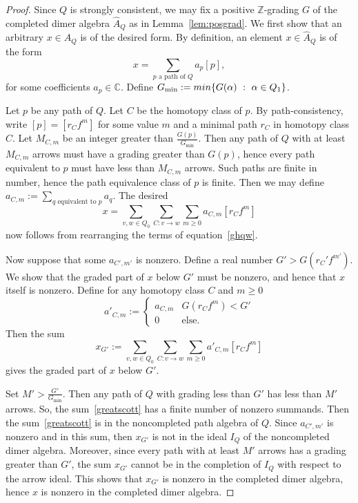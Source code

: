 \documentclass{article}
\theoremstyle{definition}
\begin{document}
\begin{proof}
Since $Q$ is strongly consistent, we may fix a positive $\mathbb Z$-grading $G$ of the completed dimer algebra $\widehat A_Q$ as in Lemma~\ref{lem:posgrad}.
	We first show that an arbitrary $x\in\widehat A_Q$ is of the desired form.
	By definition, an element $x\in\widehat A_Q$ is of the form 
	\begin{equation}\label{ghqw}x=\sum_{p\text{ a path of }Q}a_p[p],\end{equation}
	for some coefficients $a_p\in\mathbb C$.
	Define $G_{\min}:=\textup{min}\{G(\alpha)\ :\ \alpha\in Q_1\}$.

	Let $p$ be any path of $Q$.
Let $C$ be the homotopy class of $p$. By path-consistency, write $[p]=[r_Cf^{m}]$ for some value $m$ and a minimal path $r_C$ in homotopy class $C$.
	Let $M_{C,m}$ be an integer greater than $\frac{G(p)}{G_{\min}}$. Then any path of $Q$ with at least $M_{C,m}$ arrows must have a grading greater than $G(p)$, hence every path equivalent to $p$ must have less than $M_{C,m}$ arrows. Such paths are finite in number, hence the path equivalence class of $p$ is finite.
	Then we may define $a_{C,m}:=\sum_{q\text{ equivalent to }p}a_q$. The desired
\[x=\sum_{v,w\in Q_0}\sum_{C:v\to w}\sum_{m\geq0}a_{C,m}[r_Cf^m]\]
	now follows from rearranging the terms of equation~\eqref{ghqw}.

	Now suppose that some $a_{C',m'}$ is nonzero. Define a real number $G'>G(r_C'f^{m'})$. We show that the graded part of $x$ below $G'$ must be nonzero, and hence that $x$ itself is nonzero. Define for any homotopy class $C$ and $m\geq0$
	\[a'_{C,m}:=\begin{cases}
		a_{C,m}&G(r_Cf^m)<G' \\
		0&\text{else.}
	\end{cases}\]
	Then the sum
	\begin{equation}\label{greatscott}x_{G'}:=\sum_{v,w\in Q_0}\sum_{C:v\to w}\sum_{m\geq0}a'_{C,m}[r_Cf^m]\end{equation}
	gives the graded part of $x$ below $G'$.

	Set $M'>\frac{G'}{G_{\min}}$. Then any path of $Q$ with grading less than $G'$ has less than $M'$ arrows. So, the sum~\eqref{greatscott} has a finite number of nonzero summands. Then the sum~\eqref{greatscott} is in the noncompleted path algebra of $Q$. Since $a_{C',m'}$ is nonzero and in this sum, then $x_{G'}$ is not in the ideal $I_Q$ of the noncompleted dimer algebra.
	Moreover, since every path with at least $M'$ arrows has a grading greater than $G'$, the sum $x_{G'}$ cannot be in the completion of $I_Q$ with respect to the arrow ideal. This shows that $x_{G'}$ is nonzero in the completed dimer algebra, hence $x$ is nonzero in the completed dimer algebra.
\end{proof}
\end{document}
